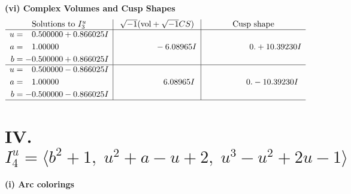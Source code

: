 \documentclass[1p]{elsarticle_modified}
\theoremstyle{definition}
\newcommand{\I}{\sqrt{-1}}
\begin{document}
\newpage\flushleft \textbf{(vi) Complex Volumes and Cusp Shapes}
$$\begin{array}{c|c|c}  
\text{Solutions to }I^u_{3}& \I (\text{vol} + \sqrt{-1}CS) & \text{Cusp shape}\\
 \hline 
\begin{aligned}
u &= \phantom{-}0.500000 + 0.866025 I \\
a &= \phantom{-}1.00000\phantom{ +0.000000I} \\
b &= -0.500000 + 0.866025 I\end{aligned}
 & \phantom{-0.000000 } -6.08965 I & \phantom{-0.000000 -}0. + 10.39230 I \\ \hline\begin{aligned}
u &= \phantom{-}0.500000 - 0.866025 I \\
a &= \phantom{-}1.00000\phantom{ +0.000000I} \\
b &= -0.500000 - 0.866025 I\end{aligned}
 & \phantom{-0.000000 -}6.08965 I & \phantom{-0.000000 } 0. - 10.39230 I\\
 \hline 
 \end{array}$$\newpage\newpage\renewcommand{\arraystretch}{1}
\centering \section*{IV. $I^u_{4}= \langle b^2+1,\;u^2+a- u+2,\;u^3- u^2+2 u-1 \rangle$}
\flushleft \textbf{(i) Arc colorings}\\
\end{document}
